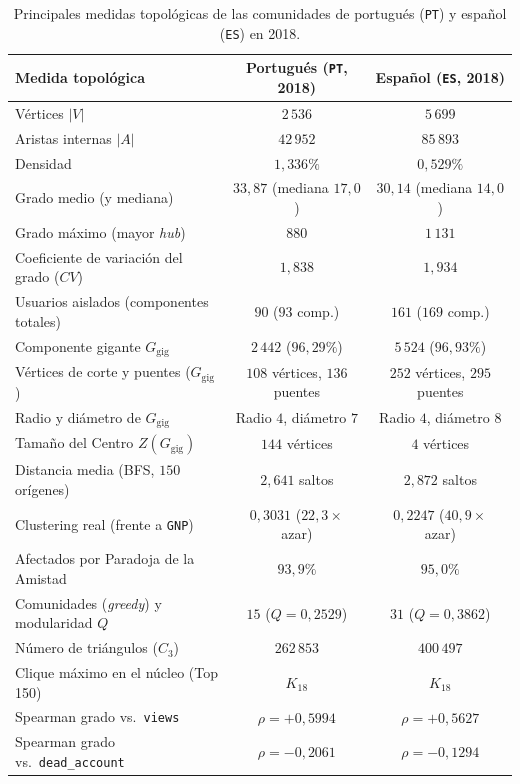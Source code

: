 \documentclass[11pt,a4paper]{article}
\begin{document}
\begin{table}[H]
\centering
\caption{Principales medidas topológicas de las comunidades de portugués (\texttt{PT}) y español (\texttt{ES}) en 2018.}
\label{tab:pt_es}
\footnotesize
\renewcommand{\arraystretch}{0.95}
\begin{tabular}{@{}lcc@{}}
\toprule
\textbf{Medida topológica} & \textbf{Portugués (\texttt{PT}, 2018)} & \textbf{Español (\texttt{ES}, 2018)} \\
\midrule
Vértices $|V|$ & $2\,536$ & $5\,699$ \\
Aristas internas $|A|$ & $42\,952$ & $85\,893$ \\
Densidad & $1,336\%$ & $0,529\%$ \\
Grado medio (y mediana) & $33,87$ (mediana $17,0$) & $30,14$ (mediana $14,0$) \\
Grado máximo (mayor \textit{hub}) & $880$ & $1\,131$ \\
Coeficiente de variación del grado ($CV$) & $1,838$ & $1,934$ \\
Usuarios aislados (componentes totales) & $90$ ($93$ comp.) & $161$ ($169$ comp.) \\
Componente gigante $G_{\text{gig}}$ & $2\,442$ ($96,29\%$) & $5\,524$ ($96,93\%$) \\
Vértices de corte y puentes ($G_{\text{gig}}$) & $108$ vértices, $136$ puentes & $252$ vértices, $295$ puentes \\
Radio y diámetro de $G_{\text{gig}}$ & Radio $4$, diámetro $7$ & Radio $4$, diámetro $8$ \\
Tamaño del Centro $Z(G_{\text{gig}})$ & $144$ vértices & $4$ vértices \\
Distancia media (BFS, $150$ orígenes) & $2,641$ saltos & $2,872$ saltos \\
Clustering real (frente a \texttt{GNP}) & $0,3031$ ($22,3\times$ azar) & $0,2247$ ($40,9\times$ azar) \\
Afectados por Paradoja de la Amistad & $93,9\%$ & $95,0\%$ \\
Comunidades (\textit{greedy}) y modularidad $Q$ & $15$ ($Q = 0,2529$) & $31$ ($Q = 0,3862$) \\
Número de triángulos ($C_3$) & $262\,853$ & $400\,497$ \\
Clique máximo en el núcleo (Top 150) & $K_{18}$ & $K_{18}$ \\
Spearman grado vs.\ \texttt{views} & $\rho = +0,5994$ & $\rho = +0,5627$ \\
Spearman grado vs.\ \texttt{dead\_account} & $\rho = -0,2061$ & $\rho = -0,1294$ \\
\bottomrule
\end{tabular}
\end{table}
\end{document}
